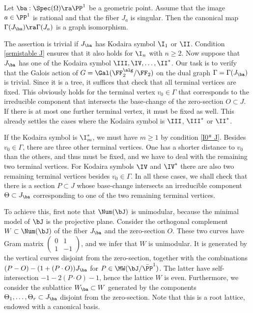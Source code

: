 \begin{proposition}
\notready
\label{bijection irreducible components}
Let $\ba:\Spec(\Omega)\ra \PP^1$ be a geometric point. Assume that the image $a\in \PP^1$ is rational
and that the fiber $J_a$ is singular. Then  the canonical map  $\Gamma(J_\ba)\ra \Gamma(J_a)$
is a graph isomorphism.
\end{proposition}

\proof
The assertion  is trivial if $J_\ba$ has Kodaira symbol $\I_1$ or $\II$.
Condition \ref{semistable J} ensures that it also holds for $\I_n$ with $n\geq 2$.
Now suppose that  $J_\ba$ has one of the Kodaira symbol $\III,\IV,\ldots,\II^*$.
Our task is to verify that the  Galois action of $G=\Gal(\FF_2^\alg/\FF_2)$ on the dual graph $\Gamma=\Gamma(J_\ba)$
is trivial.
Since it is a tree, it suffices that check that all terminal vertices are fixed.
This obviously holds for the terminal vertex $v_0\in\Gamma$ that corresponds to
the irreducible component   that intersects the base-change of the zero-section $O\subset J$.
If there is at most one further terminal vertex, it must be fixed as well.
This already settles the cases where the Kodaira symbol is   $\III$, $\III^*$ or $\II^*$.

If the Kodaira symbol is $\I_m^*$, we must have $m\geq 1$ by condition \ref{I0* J}.
Besides  $v_0\in\Gamma$, there are three other terminal vertices. One has a shorter distance
to $v_0$ than the others, and thus must be fixed, and we have to deal with the remaining two
terminal vertices.
For  Kodaira symbols $\IV$ and $\IV^*$ there are also two remaining terminal vertices besides $v_0\in\Gamma$.
In all these cases, we shall check  that there is a section $P\subset J$
whose base-change intersects an irreducible component   $\Theta\subset J_\ba$
corresponding to one of the two remaining terminal vertices.

To achieve this, first note that $\Num(\bJ)$
is unimodular, because  the  minimal model of $\bJ$ is the projective plane.
Consider the orthogonal complement $W\subset\Num(\bJ)$ of the fiber $J_\ba$ and the zero-section $O$.
These two curves have Gram matrix $(\begin{smallmatrix}0&1\\1&-1\end{smallmatrix})$, and we infer that
$W$ is unimodular. It is generated by the vertical curves disjoint from the zero-section,
together with the combinations $(P-O)-(1+(P\cdot O))J_\ba$ for $P\in \MW(\bJ/\bar{\PP}^1)$.
The latter have self-intersection $-1-2(P\cdot O)-1$, hence  the lattice $W$ is even.
Furthermore, we consider the sublattice $W_\ba\subset W$  generated by the components $\Theta_1,\ldots,\Theta_r\subset J_\ba$ disjoint
from the zero-section. Note that this  is a root lattice, endowed with a canonical basis.

